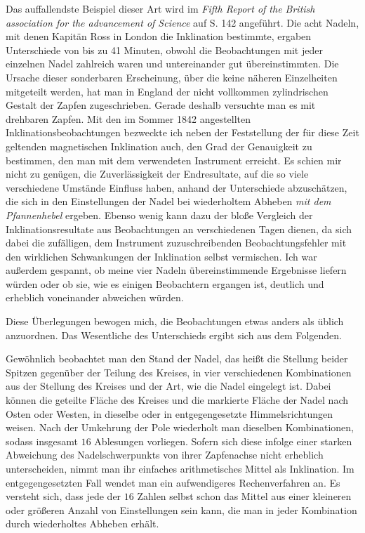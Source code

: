 \expandafter\def\csname HistoricalNoteText457\endcsname{Das auffallendste Beispiel dieser Art wird im \textit{Fifth Report of the British association for the advancement of Science} auf S. 142 angeführt. Die acht Nadeln, mit denen Kapitän Ross in London die Inklination bestimmte, ergaben Unterschiede von bis zu 41 Minuten, obwohl die Beobachtungen mit jeder einzelnen Nadel zahlreich waren und untereinander gut übereinstimmten. Die Ursache dieser sonderbaren Erscheinung, über die keine näheren Einzelheiten mitgeteilt werden, hat man in England der nicht vollkommen zylindrischen Gestalt der Zapfen zugeschrieben. Gerade deshalb versuchte man es mit drehbaren Zapfen.}%
Mit den im Sommer 1842 angestellten Inklinationsbeobachtungen be\-zweckte ich neben der Feststellung der für diese Zeit geltenden magnetischen Inklination auch, den Grad der Genauigkeit zu bestimmen, den man mit dem verwendeten Instrument erreicht. Es schien mir nicht zu genügen, die Zuverlässigkeit der Endresultate, auf die so viele verschiedene Umstände Einfluss haben, anhand der Unterschiede abzuschätzen, die sich in den Einstellungen der Nadel bei wiederholtem Abheben \textit{mit dem Pfannenhebel} ergeben. Ebenso wenig kann dazu der bloße Vergleich der Inklinationsresultate aus Beobachtungen an verschiedenen Tagen dienen, da sich dabei die zufälligen, dem Instrument zuzuschreibenden Beobachtungsfehler mit den wirklichen Schwankungen der Inklination selbst vermischen. Ich war außerdem gespannt, ob meine vier Nadeln übereinstimmende Ergebnisse liefern würden oder ob sie, wie es einigen Beobachtern ergangen ist, deutlich und erheblich voneinander abweichen würden.

Diese Überlegungen bewogen mich, die Beobachtungen etwas anders als üblich anzuordnen. Das Wesentliche des Unterschieds ergibt sich aus dem Folgenden.

Gewöhnlich beobachtet man den Stand der Nadel, das heißt die Stellung beider Spitzen gegenüber der Teilung des Kreises, in vier verschiedenen Kombinationen aus der Stellung des Kreises und der Art, wie die Nadel eingelegt ist. Dabei können die geteilte Fläche des Kreises und die markierte Fläche der Nadel nach Osten oder Westen, in dieselbe oder in entgegengesetzte Himmelsrichtungen weisen. Nach der Umkehrung der Pole wiederholt man dieselben Kombinationen, sodass insgesamt $16$ Ablesungen vorliegen. Sofern sich diese infolge einer starken Abweichung des Nadelschwerpunkts von ihrer Zapfenachse nicht erheblich unterscheiden, nimmt man ihr einfaches arithmetisches Mittel als Inklination. Im entgegengesetzten Fall wendet man ein aufwendigeres Rechenverfahren an. Es versteht sich, dass jede der $16$ Zahlen
selbst schon das Mittel aus einer kleineren oder größeren Anzahl von Einstellungen sein kann, die man in jeder Kombination durch wiederholtes Abheben erhält.

